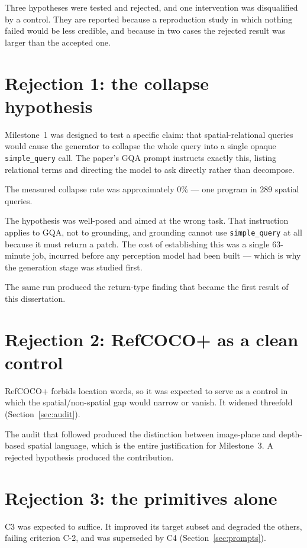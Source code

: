 \documentclass[12pt,a4paper,oneside]{report}
\begin{document}
Three hypotheses were tested and rejected, and one intervention was disqualified by a
control. They are reported because a reproduction study in which nothing failed would be
less credible, and because in two cases the rejected result was larger than the accepted
one.

\section{Rejection 1: the collapse hypothesis}

Milestone~1 was designed to test a specific claim: that spatial-relational queries would
cause the generator to collapse the whole query into a single opaque
\texttt{simple\_query} call. The paper's GQA prompt instructs exactly this, listing
relational terms and directing the model to ask directly rather than decompose.

The measured collapse rate was approximately $0\%$ --- one program in 289 spatial queries.

The hypothesis was well-posed and aimed at the wrong task. That instruction applies to
GQA, not to grounding, and grounding cannot use \texttt{simple\_query} at all because it
must return a patch. The cost of establishing this was a single 63-minute job, incurred
before any perception model had been built --- which is why the generation stage was
studied first.

The same run produced the return-type finding that became the first result of this
dissertation.

\section{Rejection 2: RefCOCO+ as a clean control}

RefCOCO+ forbids location words, so it was expected to serve as a control in which the
spatial/non-spatial gap would narrow or vanish. It widened threefold
(Section~\ref{sec:audit}).

The audit that followed produced the distinction between image-plane and depth-based
spatial language, which is the entire justification for Milestone~3. A rejected
hypothesis produced the contribution.

\section{Rejection 3: the primitives alone}

C3 was expected to suffice. It improved its target subset and degraded the others,
failing criterion C-2, and was superseded by C4 (Section~\ref{sec:prompts}).
\end{document}
